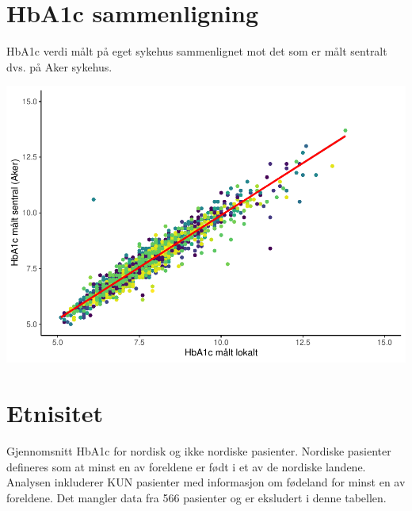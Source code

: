 \documentclass[]{article}
\begin{document}
\newpage

\hypertarget{hba1c-sammenligning}{%
\section{HbA1c sammenligning}\label{hba1c-sammenligning}}

HbA1c verdi målt på eget sykehus sammenlignet mot det som er målt
sentralt dvs. på Aker sykehus.

\includegraphics{benchrap_files/figure-latex/samenlikHba1c-1.pdf}

\newpage

\hypertarget{etnisitet}{%
\section{Etnisitet}\label{etnisitet}}

Gjennomsnitt HbA1c for nordisk og ikke nordiske pasienter. Nordiske
pasienter defineres som at minst en av foreldene er født i et av de
nordiske landene. Analysen inkluderer KUN pasienter med informasjon om
fødeland for minst en av foreldene. Det mangler data fra 566 pasienter
og er eksludert i denne tabellen.

 
  \providecommand{\huxb}[2]{\arrayrulecolor[RGB]{#1}\global\arrayrulewidth=#2pt}
  \providecommand{\huxvb}[2]{\color[RGB]{#1}\vrule width #2pt}
  \providecommand{\huxtpad}[1]{\rule{0pt}{\baselineskip+#1}}
  \providecommand{\huxbpad}[1]{\rule[-#1]{0pt}{#1}}
\end{document}
